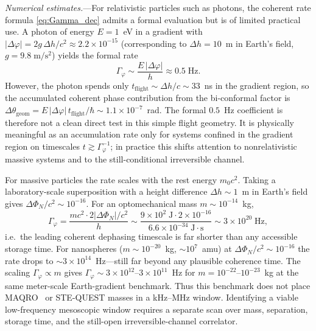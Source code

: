 \documentclass[aps,prd,onecolumn,superscriptaddress,nofootinbib,showpacs,12pt,notitlepage]{revtex4-2}
\begin{document}
\textit{Numerical estimates.}---For relativistic particles
such as photons, the coherent rate formula \eqref{eq:Gamma_dec}
admits a formal evaluation but is of limited practical
use.  A photon of energy $E = 1$~eV in a gradient with
$|\Delta\varphi| = 2g\,\Delta h/c^{2} \approx
2.2\times 10^{-15}$ (corresponding to $\Delta h = 10$~m in
Earth's field, $g = 9.8\;\mathrm{m/s^2}$) yields the formal
rate
\begin{equation}
  \Gamma_{\varphi}
  \sim \frac{E\,|\Delta\varphi|}{h}
  \approx 0.5\;\mathrm{Hz}.
\end{equation}
However, the photon spends only
$t_{\mathrm{flight}} \sim \Delta h/c \sim 33$~ns in the
gradient region, so the accumulated coherent phase
contribution from the bi-conformal factor is
$\Delta\theta_{\mathrm{geom}} =
E\,|\Delta\varphi|\,t_{\mathrm{flight}}/\hbar
\sim 1.1\times 10^{-7}$~rad.  The formal $0.5$~Hz
coefficient is therefore not a clean direct test in this
simple flight geometry.  It is physically meaningful as an
accumulation rate only for systems confined in the gradient
region on timescales $t \gtrsim \Gamma_{\varphi}^{-1}$; in
practice this shifts attention to nonrelativistic massive
systems and to the still-conditional irreversible channel.

For massive particles the rate scales with the rest
energy $m_0 c^2$.  Taking a laboratory-scale
superposition with a height difference
$\Delta h \sim 1$~m in Earth's field gives
$\Delta\Phi_N/c^{2}\sim 10^{-16}$.  For an
optomechanical mass $m\sim 10^{-14}$~kg,
\begin{equation}
  \Gamma_{\varphi}
  = \frac{m c^{2}\cdot 2|\Delta\Phi_N|/c^{2}}{h}
  \sim \frac{9\times 10^{2}\;\mathrm{J}\cdot
    2\times 10^{-16}}{6.6\times 10^{-34}\;\mathrm{J\cdot s}}
  \sim 3\times 10^{20}\;\mathrm{Hz},
\end{equation}
i.e.\ the leading coherent dephasing timescale is far shorter
than any accessible storage time.  For nanospheres
($m\sim 10^{-20}$~kg, $\sim 10^{7}$~amu) at
$\Delta\Phi_N/c^{2}\sim 10^{-16}$ the rate drops to
$\sim 3\times 10^{14}$~Hz---still far beyond any
plausible coherence time.  The scaling
$\Gamma_{\varphi}\propto m$ gives
$\Gamma_{\varphi}\sim 3\times 10^{12}$--$3\times 10^{11}$~Hz
for $m=10^{-22}$--$10^{-23}$~kg at the same meter-scale
Earth-gradient benchmark.  Thus this benchmark does not place
MAQRO~\cite{Kaltenbaek2012} or STE-QUEST masses in a
kHz--MHz window.  Identifying a viable low-frequency
mesoscopic window requires a separate scan over mass,
separation, storage time, and the still-open
irreversible-channel correlator.
\end{document}
